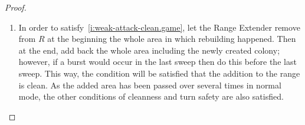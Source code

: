\documentclass[11pt]{memoir}
\theoremstyle{definition} %
\renewcommand{\ge}{\geq}
\def\B{B}
\newcommand{\E}{E} %
\newcommand{\Q}{Q} %
\newcommand{\Rg}{R} %
\newcommand{\cns}[1]{c_{\textrm{\upshape #1}}}
\newcommand{\CRebuild}{\cns{Rebuild}}
\newcommand{\CSpill}{\cns{spill}}
\begin{document}
\begin{proof}
\begin{enumerate}
\item In order to satisfy~\eqref{i:weak-attack-clean.game}, let the Range Extender remove from \( \Rg \)
  at the beginning the whole area in which rebuilding happened.
  Then at the end, add back the whole area including the newly created colony; however,
  if a burst would occur in the last sweep then do this before the last sweep.
  This way, the condition will be satisfied that the addition to the range is clean.
  As the added area has been passed over several times in normal mode, the other
  conditions of cleanness and turn safety are also satisfied.
  






  
  

\end{enumerate}
\end{proof}
\end{document}
